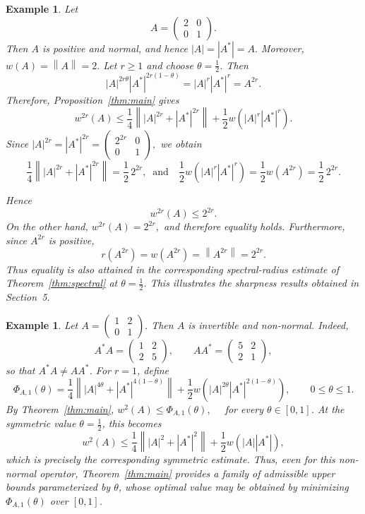 \documentclass[final,1p,times]{elsarticle}
\newtheorem{example}[thm]{Example}
\newcommand{\norm}[1]{\left\lVert #1 \right\rVert}
\begin{document}
\begin{example}
Let
\[
A=
\begin{pmatrix}
2&0\\
0&1
\end{pmatrix}.
\]
Then $A$ is positive and normal, and hence $|A|=|A^*|=A.$ Moreover,
$w(A)=\norm{A}=2.$
Let $r\geq1$ and choose $\theta=\frac12$. Then
\[
|A|^{2r\theta}|A^*|^{2r(1-\theta)}
=
|A|^r|A^*|^r
=
A^{2r}.
\]
Therefore, Proposition~\ref{thm:main} gives
\[
w^{2r}(A)
\leq
\frac14\norm{|A|^{2r}+|A^*|^{2r}}
+
\frac12 w\!\left(|A|^r|A^*|^r\right).
\]
Since $|A|^{2r}=|A^*|^{2r}
=
\begin{pmatrix}
2^{2r}&0\\
0&1
\end{pmatrix},$ we obtain
\[
\frac14\norm{|A|^{2r}+|A^*|^{2r}}
=
\frac12\,2^{2r},\;\;\text{and}\quad \frac12w\!\left(|A|^r|A^*|^r\right)
=
\frac12w(A^{2r})
=
\frac12\,2^{2r}.
\]

Hence
\[
w^{2r}(A)
\leq
2^{2r}.
\]
On the other hand, $w^{2r}(A)=2^{2r},$ and therefore equality holds. Furthermore, since $A^{2r}$ is positive,
\[
r(A^{2r})=w(A^{2r})=\norm{A^{2r}}=2^{2r}.
\]
Thus equality is also attained in the corresponding spectral-radius
estimate of Theorem~\ref{thm:spectral} at $\theta=\frac12$.
This illustrates the sharpness results obtained in Section~5.
\end{example}

\medskip

\begin{example}
Let $A=
\begin{pmatrix}
1&2\\
0&1
\end{pmatrix}.$ Then $A$ is invertible and non-normal. Indeed,
\[
A^*A
=
\begin{pmatrix}
1&2\\
2&5
\end{pmatrix},
\qquad
AA^*
=
\begin{pmatrix}
5&2\\
2&1
\end{pmatrix},
\]
so that $A^*A\neq AA^*$. For $r=1$, define
\[
\Phi_{A,1}(\theta)
=
\frac14
\norm{
|A|^{4\theta}
+
|A^*|^{4(1-\theta)}
}
+
\frac12
w\!\left(
|A|^{2\theta}|A^*|^{2(1-\theta)}
\right),
\qquad 0\leq\theta\leq1.
\]
By Theorem~\ref{thm:main}, $w^2(A)\leq\Phi_{A,1}(\theta),\quad$
for every $\theta\in[0,1]$. At the symmetric value $\theta=\frac12$, this becomes
\[
w^2(A)
\leq
\frac14\norm{|A|^2+|A^*|^2}
+
\frac12w(|A||A^*|),
\]
which is precisely the corresponding symmetric estimate.
Thus, even for this non-normal operator, Theorem~\ref{thm:main}
provides a family of admissible upper bounds parameterized by
$\theta$, whose optimal value may be obtained by minimizing
$\Phi_{A,1}(\theta)$ over $[0,1]$.
\end{example}
\end{document}
